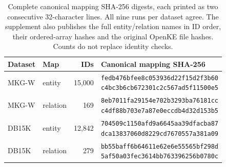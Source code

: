 \begin{table}[htbp]
\centering\footnotesize
\caption{Complete canonical mapping SHA-256 digests, each printed as two consecutive 32-character lines. All nine runs per dataset agree. The supplement also publishes the full entity/relation names in ID order, their ordered-array hashes and the original OpenKE file hashes. Counts do not replace identity checks.}
\label{tab:alignment-mapping}
\begin{tabular}{llrl}
\toprule
Dataset & Map & IDs & Canonical mapping SHA-256\\
\midrule
MKG-W & entity & 15,000 & \shortstack[l]{\texttt{fedb476bfee8c053936d22f15d2f3b60}\\\texttt{c4bc3b6cb672301c2c567ad5f11500e5}}\\[3pt]
MKG-W & relation & 169 & \shortstack[l]{\texttt{8eb7011fa29154e702b3293ba76181cc}\\\texttt{c4df88b703e7a87e0eccdb4d32d153b5}}\\[3pt]
DB15K & entity & 12,842 & \shortstack[l]{\texttt{704509c1150afd9a6645aa39dfacba87}\\\texttt{dca13837060d8229cd7670557a381a09}}\\[3pt]
DB15K & relation & 279 & \shortstack[l]{\texttt{bb55baff6b64611e62e6e55565bf298d}\\\texttt{5af50a03fec3614bb763396256b0780c}}\\[3pt]
\bottomrule
\end{tabular}
\end{table}
